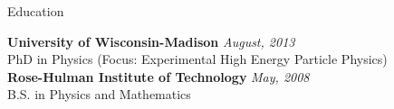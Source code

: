 \documentclass{resume} %
\begin{document}






\begin{rSection}{Education}

{\bf University of Wisconsin-Madison} \hfill {\em August, 2013} \\ 
\/PhD in Physics (Focus: Experimental High Energy Particle Physics) \\
{\bf Rose-Hulman Institute of Technology} \hfill {\em May, 2008} \\
B.S. in Physics and Mathematics\\
\end{rSection}

%
%
%
%
%
%
%
%
\end{document}
